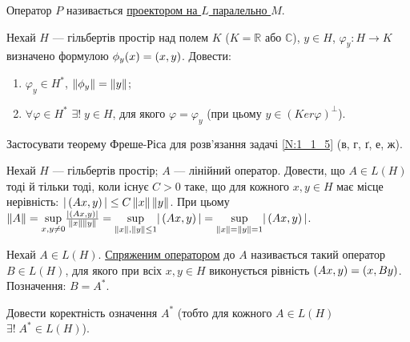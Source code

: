 \begin{theory}
    Оператор $P$ називається \uline{проектором на $L$ паралельно $M$}.
\end{theory}

\begin{exercise}
    Нехай $H$ --- гільбертів простір над полем $K$ ($K=\mathbb{R}$ 
    або $\mathbb{C}$), $y \in H$, $\varphi_y : H \rightarrow K$ визначено 
    формулою $\phi_y(x) = \left(x, y\right)$. Довести:
    \begin{enumerate}[label=\ukr*)]
        \item $\varphi_y \in H^*$, $\left\lVert\phi_y\right\rVert = \left\lVert y\right\rVert$;
        \item $\forall \varphi \in H^*$ $\exists! \; y\in H$, для якого 
        $\varphi = \varphi_y$ (при цьому $y\in(Ker\varphi)^\bot$).
    \end{enumerate}
\end{exercise}

\begin{exercise}
    Застосувати теорему Фреше-Ріса для розв'язання задачі \ref{N:1_1_5}
    (в, г, ґ, е, ж).
\end{exercise}

\begin{exercise}
    Нехай $H$ --- гільбертів простір; $A$ --- лінійний оператор. 
    Довести, що $A \in L(H)$ тоді й тільки тоді, коли існує 
    $C > 0$ таке, що для кожного $x, y \in H$ має місце нерівність:
    $|\left(Ax, y\right)| \leq C\left\lVert x\right\rVert\left\lVert y\right\rVert$. При цьому $\left\lVert A\right\rVert = 
    \underset{x,y \neq 0}{\sup} \frac{|\left(Ax, y\right)|}{\left\lVert x\right\rVert\left\lVert y\right\rVert}
    =\underset{\left\lVert x\right\rVert,\left\lVert y\right\rVert \leq 1}{\sup} |\left(Ax, y\right)| = 
    \underset{\left\lVert x\right\rVert = \left\lVert y\right\rVert = 1}{\sup} |\left(Ax, y\right)|$.
\end{exercise}

\begin{theory}
    Нехай $A \in L(H)$. \uline{Спряженим оператором} до $A$ називається 
    такий оператор $B \in L(H)$, для якого при всіх $x, y \in H$ 
    виконується рівність $\left(Ax, y\right) = \left(x, By\right)$. 
    Позначення: $B = A^*$. 
\end{theory}

\begin{exercise}
    Довести коректність означення $A^*$ (тобто для кожного $A\in L(H)$ 
    $\exists! \; A^* \in L(H)$).
\end{exercise}

